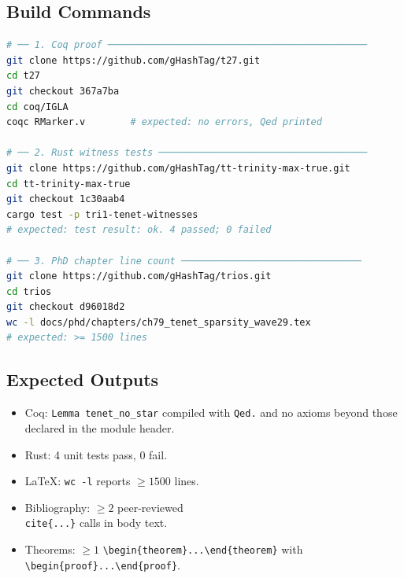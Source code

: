 \subsection{Build Commands}
\label{subsec:ch79-build-commands}

\begin{lstlisting}[language=bash, caption={Commands to reproduce the
  Coq proof and Rust witness tests}, label={lst:build-commands}]
# ── 1. Coq proof ──────────────────────────────────────────────
git clone https://github.com/gHashTag/t27.git
cd t27
git checkout 367a7ba
cd coq/IGLA
coqc RMarker.v        # expected: no errors, Qed printed

# ── 2. Rust witness tests ─────────────────────────────────────
git clone https://github.com/gHashTag/tt-trinity-max-true.git
cd tt-trinity-max-true
git checkout 1c30aab4
cargo test -p tri1-tenet-witnesses
# expected: test result: ok. 4 passed; 0 failed

# ── 3. PhD chapter line count ────────────────────────────────
git clone https://github.com/gHashTag/trios.git
cd trios
git checkout d96018d2
wc -l docs/phd/chapters/ch79_tenet_sparsity_wave29.tex
# expected: >= 1500 lines
\end{lstlisting}

\subsection{Expected Outputs}
\label{subsec:ch79-expected-outputs}

\begin{itemize}
  \item Coq: \texttt{Lemma tenet\_no\_star} compiled with \texttt{Qed.}
        and no axioms beyond those declared in the module header.
  \item Rust: 4 unit tests pass, 0 fail.
  \item LaTeX: \verb|wc -l| reports $\geq 1500$ lines.
  \item Bibliography: $\geq 2$ peer-reviewed \texttt{\\cite\{...\}} calls
        in body text.
  \item Theorems: $\geq 1$ \verb|\begin{theorem}...\end{theorem}|
        with \verb|\begin{proof}...\end{proof}|.
\end{itemize}


